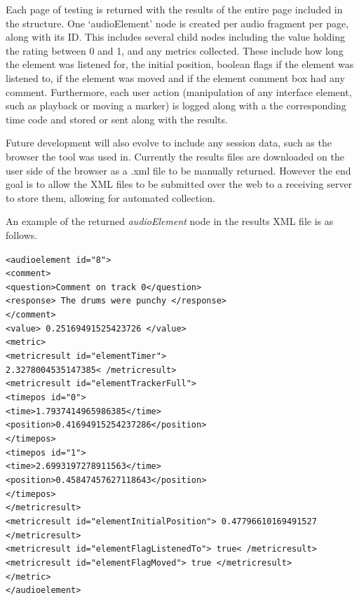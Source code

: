 \documentclass{article}
\begin{document}
Each page of testing is returned with the results of the entire page included in the structure. One `audioElement' node is created per audio fragment per page, along with its ID. This includes several child nodes including the value holding the rating between 0 and 1, and any metrics collected. These include how long the element was listened for, the initial position, boolean flags if the element was listened to, if the element was moved and if the element comment box had any comment. Furthermore, each user action (manipulation of any interface element, such as playback or moving a marker) is logged along with a the corresponding time code and stored or sent along with the results.

Future development will also evolve to include any session data, such as the browser the tool was used in. Currently the results files are downloaded on the user side of the browser as a .xml file to be manually returned. However the end goal is to allow the XML files to be submitted over the web to a receiving server to store them, allowing for automated collection.



An example of the returned \textit{audioElement} node in the results XML file is as follows.

\texttt{<audioelement id="8"> \\
<comment> \\
<question>Comment on track 0</question> \\
<response> The drums were punchy </response> \\
</comment> \\
<value> 0.25169491525423726 </value> \\
<metric> \\
<metricresult id="elementTimer"> \\ 2.3278004535147385< /metricresult> \\
<metricresult id="elementTrackerFull"> \\
<timepos id="0"> \\
<time>1.7937414965986385</time> \\
<position>0.41694915254237286</position> \\
</timepos> \\
<timepos id="1"> \\
<time>2.6993197278911563</time> \\
<position>0.45847457627118643</position> \\
</timepos> \\</metricresult> \\
<metricresult id="elementInitialPosition"> 0.47796610169491527 </metricresult> \\
<metricresult id="elementFlagListenedTo"> true< /metricresult> \\
<metricresult id="elementFlagMoved"> true </metricresult> \\
</metric> \\
</audioelement>}
\end{document}
